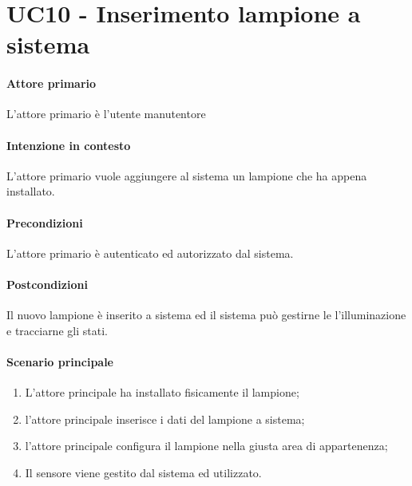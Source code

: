\section{UC10 - Inserimento lampione a sistema}\label{uc:10}

\paragraph{Attore primario} L'attore primario è l'utente manutentore
\paragraph{Intenzione in contesto} L'attore primario vuole aggiungere al sistema un lampione che ha appena installato.

\paragraph{Precondizioni} L'attore primario è autenticato ed autorizzato dal sistema.

\paragraph{Postcondizioni} Il nuovo lampione è inserito a sistema ed il sistema può gestirne le l'illuminazione e tracciarne gli stati.

\paragraph{Scenario principale}

\begin{enumerate}
    \item L'attore principale ha installato fisicamente il lampione;
    \item l'attore principale inserisce i dati del lampione a sistema;
    \item l'attore principale configura il lampione nella giusta area di appartenenza;
    \item Il sensore viene gestito dal sistema ed utilizzato.
\end{enumerate}
